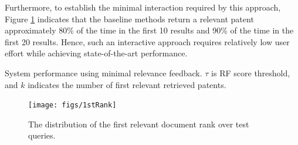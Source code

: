 Furthermore, to establish the minimal interaction required by this
approach, Figure \ref{fig:FirstTPRankHisto} indicates that the
baseline methods return a relevant patent approximately 80\% of the
time in the first 10 results and 90\% of the time in the first 20
results.  Hence, such an interactive approach requires relatively low
user effort while achieving state-of-the-art performance.
\begin{table}[t!]
  \begin{center}
   \caption{System performance using minimal relevance feedback. $\tau$ is RF score threshold, and $k$ indicates the number of first relevant retrieved patents.}\vspace{3mm}
     
  \label{tab:firstrel}
  \end{center}  
\end{table}
\begin{figure}[t!]
\begin{centering}
\texttt{[image: figs/1stRank]}
\par\end{centering}

\protect\caption{The distribution of the first relevant document rank over test queries.}
\label{fig:FirstTPRankHisto}
\end{figure}

